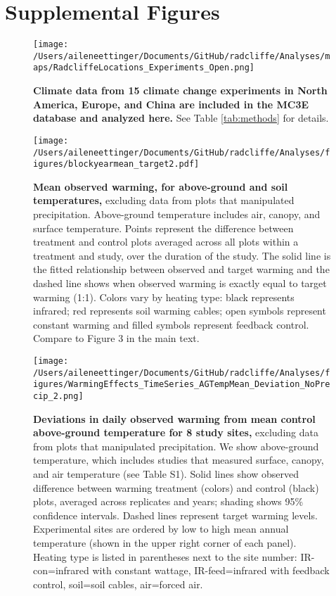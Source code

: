 \documentclass{article}
\begin{document}
\section* {Supplemental Figures}
\begin{figure}[p]
\centering
\texttt{[image: /Users/aileneettinger/Documents/GitHub/radcliffe/Analyses/maps/RadcliffeLocations\_Experiments\_Open.png]} 
\caption{\textbf{Climate data from 15 climate change experiments in North America, Europe, and China are included in the MC3E database and analyzed here.} See Table \ref{tab:methods} for details.} 
\label{fig:map}
\end{figure}
\clearpage
\begin{figure}[h]
\centering
\texttt{[image: /Users/aileneettinger/Documents/GitHub/radcliffe/Analyses/figures/blockyearmean\_target2.pdf]}
\caption{\textbf{Mean observed warming, for above-ground and soil temperatures,} excluding data from plots that manipulated precipitation. Above-ground temperature includes air, canopy, and surface temperature. Points represent the difference between treatment and control plots averaged across all plots within a treatment and study, over the duration of the study. The solid line is the fitted relationship between observed and target warming and the dashed line shows when observed warming is exactly equal to target warming (1:1). Colors vary by heating type: black represents infrared; red represents soil warming cables; open symbols represent constant warming and filled symbols represent feedback control. Compare to Figure 3 in the main text.}
 \label{fig:blockyear}
 \end{figure}
\clearpage
\begin{figure}[h]
\centering
\texttt{[image: /Users/aileneettinger/Documents/GitHub/radcliffe/Analyses/figures/WarmingEffects\_TimeSeries\_AGTempMean\_Deviation\_NoPrecip\_2.png]}
\caption{\textbf{Deviations in daily observed warming from mean control above-ground temperature for 8 study sites,} excluding data from plots that manipulated precipitation. We show above-ground temperature, which includes studies that measured surface, canopy, and air temperature (see Table S1). Solid lines show observed difference between warming treatment (colors) and control (black) plots, averaged across replicates and years; shading shows 95\% confidence intervals. Dashed lines represent target warming levels. Experimental sites are ordered by low to high mean annual temperature (shown in the upper right corner of each panel). Heating type is listed in parentheses next to the site number: IR-con=infrared with constant wattage, IR-feed=infrared with feedback control, soil=soil cables, air=forced air.} 
\label{fig:effwarmagtemp}
\end{figure}

% 
\end{document}

